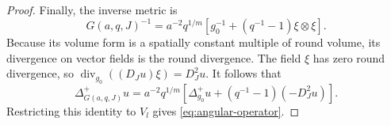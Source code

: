 \begin{proof}
Finally, the inverse metric is
\[
 G(a,q,J)^{-1}
 =a^{-2}q^{1/m}
     \left[g_0^{-1}+(q^{-1}-1)\xi\otimes\xi\right].
\]
Because its volume form is a spatially constant multiple of round
volume, its divergence on vector fields is the round divergence.
The field \(\xi\) has zero round divergence, so
\(\operatorname{div}_{g_0}((D_Ju)\xi)=D_J^2u\).
It follows that
\[
 \Delta_{G(a,q,J)}^{+}u
 =a^{-2}q^{1/m}
       \left[\Delta_{g_0}^{+}u+(q^{-1}-1)(-D_J^2u)\right].
\]
Restricting this identity to \(V_l\) gives
\eqref{eq:angular-operator}.
\end{proof}
